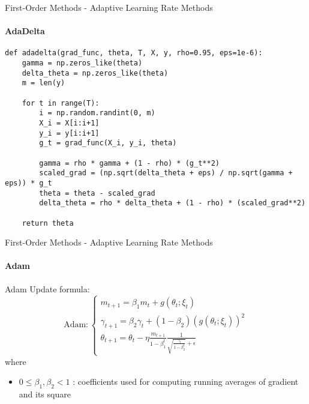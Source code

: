\documentclass{beamer}
\begin{document}
\begin{frame}[fragile]{First-Order Methods - Adaptive Learning Rate Methods}
\framesubtitle{AdaDelta}
\begin{verbatim}
def adadelta(grad_func, theta, T, X, y, rho=0.95, eps=1e-6):
    gamma = np.zeros_like(theta)       
    delta_theta = np.zeros_like(theta) 
    m = len(y)

    for t in range(T):
        i = np.random.randint(0, m)
        X_i = X[i:i+1]
        y_i = y[i:i+1]
        g_t = grad_func(X_i, y_i, theta)  

        gamma = rho * gamma + (1 - rho) * (g_t**2)  
        scaled_grad = (np.sqrt(delta_theta + eps) / np.sqrt(gamma + eps)) * g_t  
        theta = theta - scaled_grad 
        delta_theta = rho * delta_theta + (1 - rho) * (scaled_grad**2)  

    return theta
\end{verbatim}
\end{frame}

\begin{frame}[fragile]{First-Order Methods - Adaptive Learning Rate Methods}
\framesubtitle{Adam}
\begin{block}{Adam}
Update formula:
\[
\text{Adam}:\begin{cases}
m_{t+1} = \beta_{1}m_{t} +g(\theta_{t};\xi_{t})    \\
\gamma_{t+1} = \beta_{2}\gamma_t + (1-\beta_2)(g(\theta_{t};\xi_{t}))^2 \\
\theta_{t+1} = \theta_t - \eta \frac{m_{t+1}}{1-\beta_1^t} \frac{1}{\sqrt{\frac{\gamma_t}{1-\beta_2^t}}+\epsilon}
\end{cases}
\]
where
\begin{itemize}

    \item $0 \le \beta_1,\beta_2 < 1$ : coefficients used for computing running averages of gradient and its square

\end{itemize}
\end{block}
\end{frame}
\end{document}
